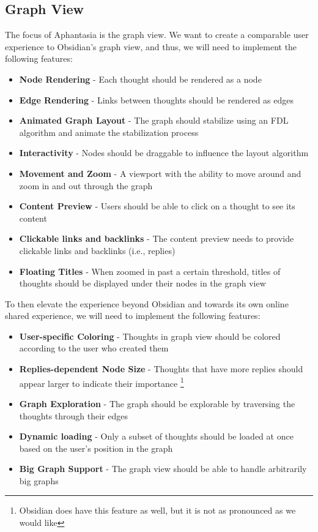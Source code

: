 \subsection{Graph View}
The focus of Aphantasia is the graph view.
We want to create a comparable user experience to Obsidian's graph view, and thus, we will need to implement the following features:
\begin{itemize}
  \item \textbf{Node Rendering} - Each thought should be rendered as a node
  \item \textbf{Edge Rendering} - Links between thoughts should be rendered as edges
  \item \textbf{Animated Graph Layout} - The graph should stabilize using an FDL algorithm and animate the stabilization process
  \item \textbf{Interactivity} - Nodes should be draggable to influence the layout algorithm
  \item \textbf{Movement and Zoom} - A viewport with the ability to move around and zoom in and out through the graph
  \item \textbf{Content Preview} - Users should be able to click on a thought to see its content
  \item \textbf{Clickable links and backlinks} - The content preview needs to provide clickable links and backlinks (i.e., replies)
  \item \textbf{Floating Titles} - When zoomed in past a certain threshold, titles of thoughts should be displayed under their nodes in the graph view
\end{itemize}

To then elevate the experience beyond Obsidian and towards its own online shared experience, we will need to implement the following features:
\begin{itemize}
  \item \textbf{User-specific Coloring} - Thoughts in graph view should be colored according to the user who created them
  \item \textbf{Replies-dependent Node Size} - Thoughts that have more replies should appear larger to indicate their importance
  \footnote{Obsidian does have this feature as well, but it is not as pronounced as we would like}
  \item \textbf{Graph Exploration} - The graph should be explorable by traversing the thoughts through their edges
  \item \textbf{Dynamic loading} - Only a subset of thoughts should be loaded at once based on the user's position in the graph
  \item \textbf{Big Graph Support} - The graph view should be able to handle arbitrarily big graphs
\end{itemize}

